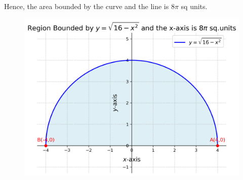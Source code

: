 \documentclass[journal,12pt,onecolumn]{IEEEtran}
\theoremstyle{remark}
\begin{document}
Hence, the area bounded by the curve and the line is $8\pi$ sq units.\\
\begin{figure}[h]
	\centering
	\includegraphics[scale=0.7]{figs/plot.png}
	\label{Fig}
\end{figure}
\end{document}
